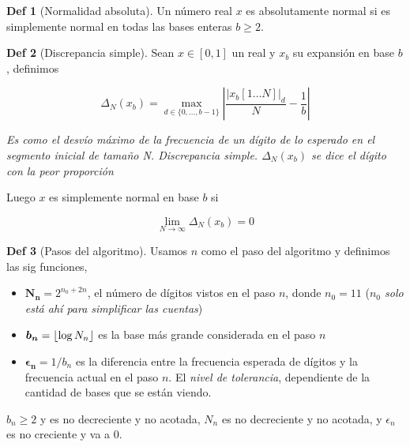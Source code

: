 \documentclass{report}
\theoremstyle{definition} %
\newtheorem*{definition*}{Def}
\DeclarePairedDelimiter\floor{\lfloor}{\rfloor}
\begin{document}
\begin{definition*}[Normalidad absoluta]
    Un número real $x$ es absolutamente normal si es simplemente normal en todas
    las bases enteras $b \geq 2$.
\end{definition*}

\begin{definition*}[Discrepancia simple]
    Sean $x \in [0, 1]$ un real y $x_b$ su expansión en base $b$, definimos
    
    \[
        \Delta_N(x_b) = \max_{d \in \{ 0, \dots, b-1 \}}
        \left|
            \frac{|x_b[1\dots N]|_d}{N} - \frac{1}{b}
        \right|
    \]

    \textit{Es como el desvío máximo de la frecuencia de un dígito de lo esperado en el segmento inicial de tamaño N. Discrepancia simple. $\Delta_N(x_b)$ se dice el dígito con la peor proporción}

    Luego $x$ es simplemente normal en base $b$ si

    \[ \lim_{N \to \infty} \Delta_N(x_b) = 0 \]

\end{definition*}

\begin{definition*}[Pasos del algoritmo]
    Usamos $n$ como el paso del algoritmo y definimos las sig funciones,
    
    \begin{itemize}
        \item[] $\bm{N_n} = 2^{n_0 + 2n}$, el número de dígitos vistos en el paso
        $n$, donde $n_0 = 11$ (\textit{$n_0$ solo está ahí para simplificar las
        cuentas})
        
        \item[] $\bm{b_n} = \floor{\log{N_n}}$ es la base más grande considerada en
        el paso $n$

        \item[] $\bm{\epsilon_n} = 1/b_n$ es la diferencia entre la frecuencia
        esperada de dígitos y la frecuencia actual en el paso $n$. El
        \textit{nivel de tolerancia}, dependiente de la cantidad de bases que se
        están viendo.
    \end{itemize}

    $b_n \geq 2$ y es no decreciente y no acotada, $N_n$ es no decreciente y no
    acotada, y $\epsilon_n$ es no creciente y va a 0.
\end{definition*}
\end{document}
